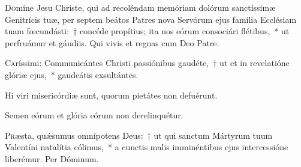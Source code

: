 \documentclass[vesperale_romanum.tex]{subfiles}
\begin{document}
\myrule


\duplex




\admagnificat


\oratio

\lettrine{D}{o}mine Jesu Christe, qui ad recoléndam memóriam dolórum san\-ctíssimæ Genitrícis tuæ, per septem beátos Patres nova Servórum ejus família Ecclésiam tuam fœcundásti:~† concéde propítius; ita nos eórum consociári flétibus,~* ut perfruámur et gáudiis. Qui vivis et regnas cum Deo Patre.

\quadcommferiae



\lettrine{C}{a}ríssimi: Communicántes Christi passiónibus gaudéte,~† ut et in revelatióne glóriæ ejus,~* gaudeátis exsultántes.

\hymnus


\vv Hi viri misericórdiæ sunt, quorum pietátes non defuérunt.

\rr Semen eórum et glória eórum non derelinquétur.

\admagnificat


\quadcommferiae

\newpage

\myrule


\oratio

\lettrine{P}{r}æsta, quǽsumus omnípotens Deus:~† ut qui san\-ctum Mártyrum tuum Valentíni natalítia cólimus,~* a cun\-ctis malis imminéntibus ejus intercessióne liberémur. Per Dóminum.

\myrule


\oratio
\end{document}
